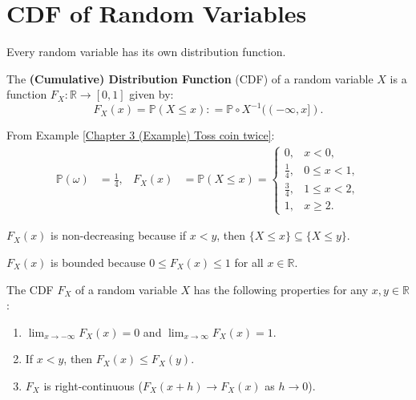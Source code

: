 \documentclass{huhtakm-template-book-v2}
\newcommand{\prob}{\mathbb{P}}
\begin{document}
\section{CDF of Random Variables}
    Every random variable has its own distribution function.
    \begin{defn}
        The \textbf{(Cumulative) Distribution Function} (CDF) of a random variable $X$ is a function $F_{X}:\mathbb{R} \to [0,1]$ given by:
        \begin{equation*}
            F_{X}(x) = \prob(X \leq x): = \prob \circ X^{-1}((-\infty,x]).
        \end{equation*}
    \end{defn}
    \begin{eg}
        From Example \ref{Chapter 3 (Example) Toss coin twice}:
        \begin{align*}
            \prob(\omega) &= \frac{1}{4}, & F_{X}(x) &= \prob(X \leq x) = \begin{cases}
                0, &x < 0,\\
                \frac{1}{4}, &0 \leq x < 1,\\
                \frac{3}{4}, &1 \leq x < 2,\\
                1, &x \geq 2.
            \end{cases}
        \end{align*}
    \end{eg}
    \begin{rem}
        $F_{X}(x)$ is non-decreasing because if $x < y$, then $\{X \leq x\}\subseteq\{X \leq y\}$.
    \end{rem}
    \begin{rem}
        $F_{X}(x)$ is bounded because $0 \leq F_{X}(x) \leq 1$ for all $x \in \mathbb{R}$.
    \end{rem}
    \begin{lem}
        The CDF $F_{X}$ of a random variable $X$ has the following properties for any $x,y \in \mathbb{R}$:
        \begin{enumerate}
            \item $\lim_{x \to -\infty}F_{X}(x) = 0$ and $\lim_{x \to \infty}F_{X}(x) = 1$.
            \item If $x < y$, then $F_{X}(x) \leq F_{X}(y)$.
            \item $F_{X}$ is right-continuous ($F_{X}(x+h) \to F_{X}(x)$ as $h \to 0$).
        \end{enumerate}
    \end{lem}
\end{document}
